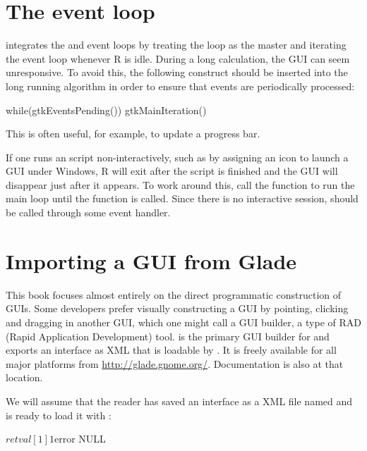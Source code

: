 
\section{The event loop}

 integrates the \GTK\/ and \R\/ event loops by treating the
\R\/ loop as the master and iterating the \GTK\/ event loop whenever R
is idle.  During a long calculation, the GUI can seem unresponsive. To
avoid this, the following construct should be inserted into the long
running algorithm in order to ensure that \GTK\/ events are
periodically processed:
\begin{Schunk}
\begin{Sinput}
 while(gtkEventsPending()) 
   gtkMainIteration()
\end{Sinput}
\end{Schunk}
This is often useful, for example, to update a progress bar.

If one runs an  script non-interactively, such as by
assigning an icon to launch a GUI under Windows, R will exit after
the script is finished and the GUI will disappear just after it
appears. To work around this, call the function  to
run the main loop until the function  is
called. Since there is no interactive session, 
should be called through some event handler.

\section{Importing a GUI from Glade}
\label{sec:gtk-glade}


This book focuses almost entirely on the direct programmatic
construction of GUIs. Some developers prefer visually constructing a
GUI by pointing, clicking and dragging in another GUI, which one might
call a GUI builder, a type of RAD (Rapid Application Development)
tool.  is the primary GUI builder for \GTK\/ and
exports an interface as XML that is loadable by . It
is freely available for all major platforms from
\url{http://glade.gnome.org/}. Documentation is also at that
location. 

We will assume that the reader has saved an interface as a
 XML file named  and is ready to
load it with :
\begin{Schunk}
\begin{Soutput}
$retval
[1] 1

$error
NULL
\end{Soutput}
\end{Schunk}


